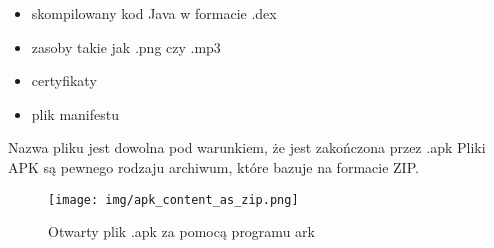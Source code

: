 \documentclass[12pt,a4paper,leqno,oneside,titlepage]{book}
\begin{document}
\begin{itemize}
\item skompilowany kod Java w formacie .dex
\item zasoby takie jak .png czy .mp3
\item certyfikaty
\item plik manifestu
\end{itemize}
Nazwa pliku jest dowolna pod warunkiem, że jest zakończona przez .apk
Pliki APK są pewnego rodzaju archiwum, które bazuje na formacie ZIP.

\begin{figure}[H]
	\centering
	\texttt{[image: img/apk\_content\_as\_zip.png]}
	\caption{Otwarty plik .apk za pomocą programu ark}
\end{figure}
\end{document}
